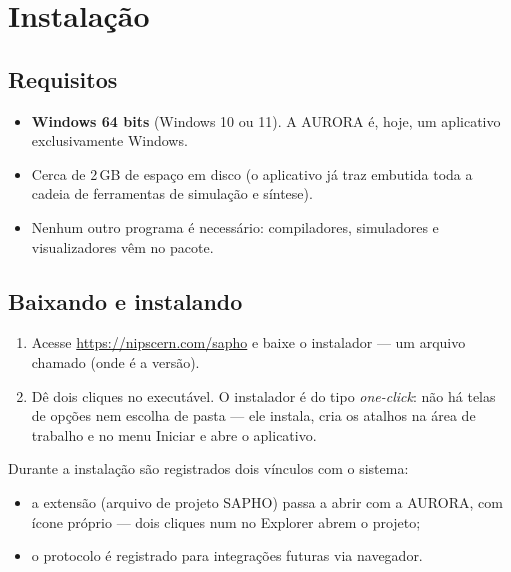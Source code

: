 \chapter{Instalação}
\label{cap:instalacao}

\section{Requisitos}

\begin{itemize}
  \item \textbf{Windows 64 bits} (Windows 10 ou 11). A AURORA é, hoje, um aplicativo exclusivamente Windows.
  \item Cerca de 2\,GB de espaço em disco (o aplicativo já traz embutida toda a cadeia de ferramentas de simulação e síntese).
  \item Nenhum outro programa é necessário: compiladores, simuladores e visualizadores vêm no pacote.
\end{itemize}

\section{Baixando e instalando}

\begin{enumerate}
  \item Acesse \url{https://nipscern.com/sapho} e baixe o instalador --- um arquivo chamado  (onde  é a versão).
  \item Dê dois cliques no executável. O instalador é do tipo \emph{one-click}: não há telas de opções nem escolha de pasta --- ele instala, cria os atalhos na área de trabalho e no menu Iniciar e abre o aplicativo.
\end{enumerate}



Durante a instalação são registrados dois vínculos com o sistema:
\begin{itemize}
  \item a extensão  (arquivo de projeto SAPHO) passa a abrir com a AURORA, com ícone próprio --- dois cliques num  no Explorer abrem o projeto;
  \item o protocolo  é registrado para integrações futuras via navegador.
\end{itemize}

